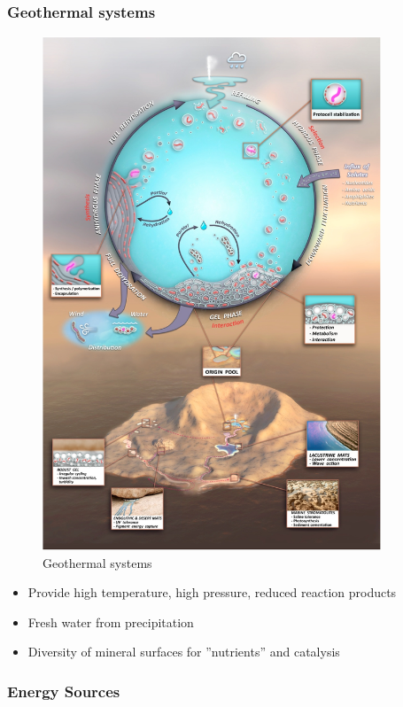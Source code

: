 \documentclass[]{article}
\begin{document}
\subsubsection{Geothermal systems}
\begin{figure}[H]
	\caption[Geothermal systems]{Geothermal systems \cite{damer2016field}}
	\includegraphics[width=0.9\textwidth]{GeothermalSystems}
\end{figure}

\begin{itemize}
	\item Provide high temperature, high pressure, reduced	reaction products
	\item Fresh water from 	precipitation
	\item Diversity of mineral	surfaces for ”nutrients” and catalysis
\end{itemize}

\subsubsection{Energy Sources}
\end{document}
